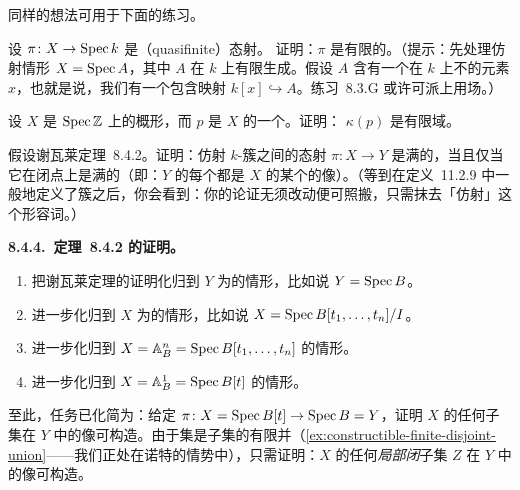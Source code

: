 同样的想法可用于下面的练习。

\begin{exercise}\label{ex:quasifinite-to-field-finite}
设 $\pi\colon X\to\operatorname{Spec} k$ 是\trQuasifinite{}（quasifinite）态射。
证明：$\pi$ 是有限的。（提示：先处理仿射情形 $X=\operatorname{Spec} A$，其中 $A$ 在 $k$ 上有限生成。假设 $A$ 含有一个在 $k$ 上不\trAlgebraic{}的元素 $x$，也就是说，我们有一个包含映射 $k[x]\hookrightarrow A$。\mbox{练习~8.3.G} 或许可派上用场。）
\end{exercise}

\begin{exercise}\label{ex:finite-type-over-z-finite-residue}
设 $X$ 是 $\operatorname{Spec}\mathbb{Z}$ 上\trFiniteType{}的概形，而 $p$ 是 $X$ 的一个\trClosedPoint。证明：\trResidueField{} $\kappa(p)$ 是有限域。
\end{exercise}

\begin{exercise}\label{ex:surjectivity-closed-points}
假设谢瓦莱定理~8.4.2。证明：仿射 $k$-簇之间的态射 $\pi\colon X\to Y$ 是满的，当且仅当它在闭点上是满的（即：$Y$ 的每个\trClosedPoint{}都是 $X$ 的某个\trClosedPoint{}的像）。（等到在定义~11.2.9 中一般地定义了簇之后，你会看到：你的论证无须改动便可照搬，只需抹去「仿射」这个形容词。）
\end{exercise}

\textbf{8.4.4.\ \trChevalley{}定理~8.4.2 的证明。}

\begin{exercise}\label{ex:chevalley-reduction}
\begin{enumerate}[label=(\alph*)]
\item 把谢瓦莱定理的证明化归到 $Y$ 为\trAffine{}的情形，比如说 $Y=\operatorname{Spec} B$。
\item 进一步化归到 $X$ 为\trAffine{}的情形，比如说 $X=\operatorname{Spec} B[t_1,\dots,t_n]/I$。
\item 进一步化归到 $X=\mathbb{A}^n_B=\operatorname{Spec} B[t_1,\dots,t_n]$ 的情形。
\item 进一步化归到 $X=\mathbb{A}^1_B=\operatorname{Spec} B[t]$ 的情形。
\end{enumerate}
\end{exercise}

至此，任务已化简为：给定 $\pi\colon X=\operatorname{Spec} B[t]\to\operatorname{Spec} B=Y$，证明 $X$ 的任何\trConstructible{}子集在 $Y$ 中的像可构造。由于\trConstructible{}集是\trLocally\trClosed{}子集的有限并（\cref{ex:constructible-finite-disjoint-union}——我们正处在诺特的情势中），只需证明：$X$ 的任何\emph{局部闭}子集 $Z$ 在 $Y$ 中的像可构造。

